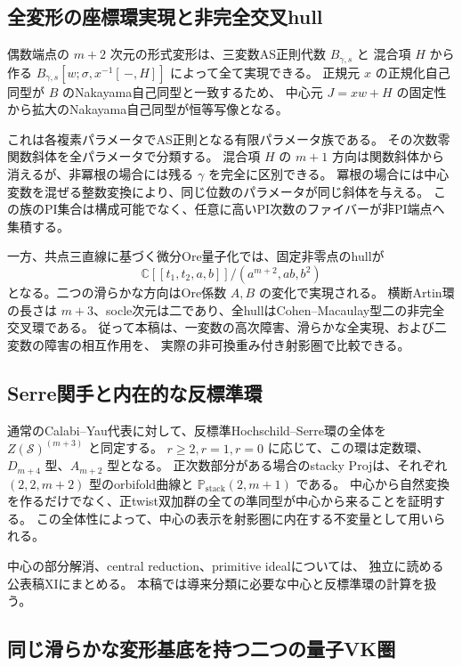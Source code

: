 \subsection{全変形の座標環実現と非完全交叉hull}

偶数端点の $m+2$ 次元の形式変形は、三変数AS正則代数 $B_{\gamma,s}$ と
混合項 $H$ から作る $B_{\gamma,s}[w;\sigma,x^{-1}[\,-,H]]$ によって全て実現できる。
正規元 $x$ の正規化自己同型が $B$ のNakayama自己同型と一致するため、
中心元 $J=xw+H$ の固定性から拡大のNakayama自己同型が恒等写像となる。

これは各複素パラメータでAS正則となる有限パラメータ族である。
その次数零関数斜体を全パラメータで分類する。
混合項 $H$ の $m+1$ 方向は関数斜体から消えるが、非冪根の場合には残る $\gamma$ を完全に区別できる。
冪根の場合には中心変数を混ぜる整数変換により、同じ位数のパラメータが同じ斜体を与える。
この族のPI集合は構成可能でなく、任意に高いPI次数のファイバーが非PI端点へ集積する。

一方、共点三直線に基づく微分Ore量子化では、固定非零点のhullが
\[
 \mathbb C[[t_1,t_2,a,b]]/(a^{m+2},ab,b^2)
\]
となる。二つの滑らかな方向はOre係数 $A,B$ の変化で実現される。
横断Artin環の長さは $m+3$、socle次元は二であり、全hullはCohen--Macaulay型二の非完全交叉環である。
従って本稿は、一変数の高次障害、滑らかな全実現、および二変数の障害の相互作用を、
実際の非可換重み付き射影圏で比較できる。

\subsection{Serre関手と内在的な反標準環}

通常のCalabi--Yau代表に対して、反標準Hochschild--Serre環の全体を
$Z(\mathcal S)^{(m+3)}$ と同定する。
$r\ge2,r=1,r=0$ に応じて、この環は定数環、$D_{m+4}$ 型、$A_{m+2}$ 型となる。
正次数部分がある場合のstacky Projは、それぞれ
$(2,2,m+2)$ 型のorbifold曲線と $\mathbb P_{\mathrm{stack}}(2,m+1)$ である。
中心から自然変換を作るだけでなく、正twist双加群の全ての準同型が中心から来ることを証明する。
この全体性によって、中心の表示を射影圏に内在する不変量として用いられる。

中心の部分解消、central reduction、primitive idealについては、
独立に読める公表稿XI\cite{VKPrimitive36}にまとめる。
本稿では導来分類に必要な中心と反標準環の計算を扱う。

\subsection{同じ滑らかな変形基底を持つ二つの量子VK圏}

